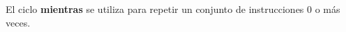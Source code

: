 
\question \tf[V] El ciclo \textbf{mientras} se utiliza para repetir un
          conjunto de instrucciones 0 o más veces.
